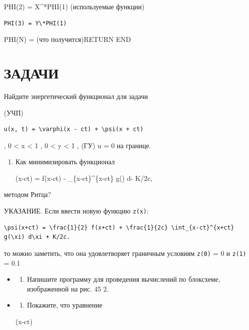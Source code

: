 \documentclass[
  ukrainian,
]{article}
\providecommand{\tightlist}{%
  \setlength{\itemsep}{0pt}\setlength{\parskip}{0pt}}
\begin{document}
PHI(2) = X\^{}*PHI(1) (используемые функции)

\begin{verbatim}
PHI(3) = Y\*PHI(1)
\end{verbatim}

PHI(N) = (что получится)RETURN END

\section{\texorpdfstring{\textbf{ЗА}ДАЧИ}{ЗАДАЧИ}}\label{ux437ux430ux434ux430ux447ux438-12}

Найдите энергетический функционал для задачи

(УЧП)

\begin{verbatim}
u(x, t) = \varphi(x - ct) + \psi(x + ct)
\end{verbatim}

, 0 \textless{} x \textless{} 1 , 0 \textless{} y \textless{} 1 , (ГУ) u
= 0 на границе.

\begin{enumerate}
\def\labelenumi{\arabic{enumi}.}
\setcounter{enumi}{1}
\item
  Как минимизировать функционал

  \varphi(x-ct) =  f(x-ct) - 
  \int\_\{x-ct\}\^{}\{x-ct\} g(\xi) d\xi - K/2c,
\end{enumerate}

методом Ритца?

УКАЗАНИЕ. Если ввести новую функцию \texttt{z(x)}:

\begin{verbatim}
\psi(x+ct) = \frac{1}{2} f(x+ct) + \frac{1}{2c} \int_{x-ct}^{x+ct} g(\xi) d\xi + K/2c.
\end{verbatim}

то можно заметить, что она удовлетворяет граничным условиям
\texttt{z(0)} = 0 и \texttt{z(1)} = 0.1

\begin{itemize}
\item
  \begin{enumerate}
  \def\labelenumi{\arabic{enumi}.}
  \setcounter{enumi}{2}
  \tightlist
  \item
    Напишите программу для проведения вычислений по блоксхеме,
    изображенной на рис. 45 2.
  \end{enumerate}
\item
  \begin{enumerate}
  \def\labelenumi{\arabic{enumi}.}
  \setcounter{enumi}{3}
  \tightlist
  \item
    Покажите, что уравнение
  \end{enumerate}

  \phi(x-ct)
\end{itemize}
\end{document}
